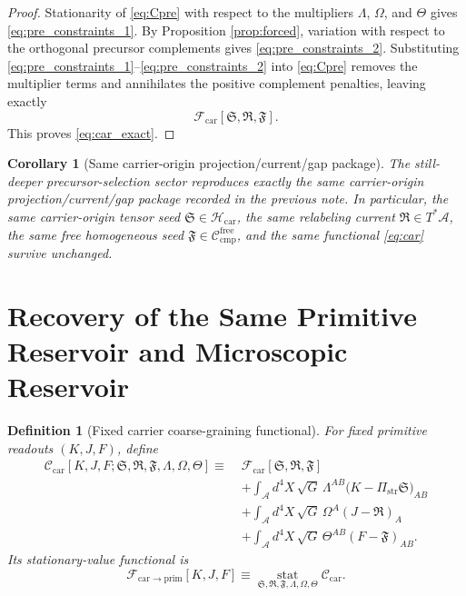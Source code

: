 \documentclass[11pt]{article}
\newcommand{\Sub}{\mathcal A}
\newcommand{\CompFree}{\mathscr C_{\mathrm{cmp}}^{\mathrm{free}}}
\newcommand{\CarrierFunctional}{\mathscr F_{\mathrm{car}}}
\newcommand{\CarrierToPrim}{\mathscr F_{\mathrm{car}\to\mathrm{prim}}}
\newcommand{\PrimStrain}{K}
\newcommand{\PrimNeutral}{J}
\newcommand{\PrimFree}{F}
\newcommand{\CarrierClass}{\mathscr H_{\mathrm{car}}}
\newcommand{\CarrierProj}{\Pi_{\mathrm{str}}}
\newcommand{\CarrierSeed}{\mathfrak S}
\newcommand{\RelabelSeed}{\mathfrak R}
\newcommand{\FreeSeed}{\mathfrak F}
\newcommand{\StrainMult}{\Lambda}
\newcommand{\NeutralMult}{\Omega}
\newcommand{\FreeMult}{\Theta}
\newtheorem{definition}{Definition}
\newtheorem{corollary}{Corollary}
\begin{document}
\begin{proof}
Stationarity of \eqref{eq:Cpre} with respect to the multipliers \(\StrainMult\), \(\NeutralMult\), and \(\FreeMult\) gives \eqref{eq:pre_constraints_1}. By Proposition \ref{prop:forced}, variation with respect to the orthogonal precursor complements gives \eqref{eq:pre_constraints_2}. Substituting \eqref{eq:pre_constraints_1}--\eqref{eq:pre_constraints_2} into \eqref{eq:Cpre} removes the multiplier terms and annihilates the positive complement penalties, leaving exactly
\[
\CarrierFunctional[\CarrierSeed,\RelabelSeed,\FreeSeed].
\]
This proves \eqref{eq:car_exact}.
\end{proof}

\begin{corollary}[Same carrier-origin projection/current/gap package]
\label{cor:same_car_package}
The still-deeper precursor-selection sector reproduces exactly the same carrier-origin projection/current/gap package recorded in the previous note. In particular, the same carrier-origin tensor seed \(\CarrierSeed\in\CarrierClass\), the same relabeling current \(\RelabelSeed\in T^*\Sub\), the same free homogeneous seed \(\FreeSeed\in\CompFree\), and the same functional \eqref{eq:car} survive unchanged.
\end{corollary}

\section{Recovery of the Same Primitive Reservoir and Microscopic Reservoir}

\begin{definition}[Fixed carrier coarse-graining functional]
\label{def:car_cg}
For fixed primitive readouts \((\PrimStrain,\PrimNeutral,\PrimFree)\), define
\begin{equation}
\begin{aligned}
\mathscr C_{\mathrm{car}}
[\PrimStrain,\PrimNeutral,\PrimFree;\CarrierSeed,\RelabelSeed,\FreeSeed,\StrainMult,\NeutralMult,\FreeMult]
\equiv\;
&\CarrierFunctional[\CarrierSeed,\RelabelSeed,\FreeSeed]
\\
&+\int_{\Sub} d^4X\,\sqrt{G}\,
\StrainMult^{AB}\bigl(\PrimStrain-\CarrierProj\CarrierSeed\bigr)_{AB}
\\
&+\int_{\Sub} d^4X\,\sqrt{G}\,
\NeutralMult^A(\PrimNeutral-\RelabelSeed)_A
\\
&+\int_{\Sub} d^4X\,\sqrt{G}\,
\FreeMult^{AB}(\PrimFree-\FreeSeed)_{AB}.
\end{aligned}
\label{eq:Ccar}
\end{equation}
Its stationary-value functional is
\begin{equation}
\CarrierToPrim[\PrimStrain,\PrimNeutral,\PrimFree]
\equiv
\operatorname*{stat}_{\CarrierSeed,\RelabelSeed,\FreeSeed,\StrainMult,\NeutralMult,\FreeMult}
\mathscr C_{\mathrm{car}}.
\label{eq:Fcarstat}
\end{equation}
\end{definition}
\end{document}
